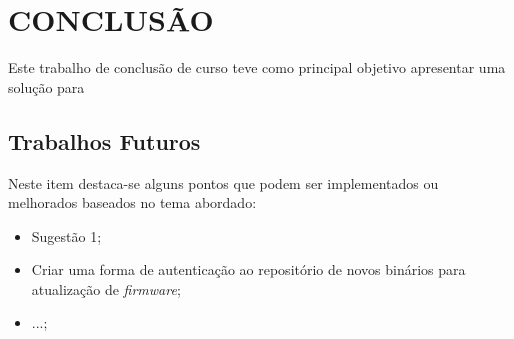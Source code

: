 
\chapter{CONCLUSÃO}
\label{chap:conclusao}

Este trabalho de conclusão de curso teve como principal objetivo apresentar uma solução para 

\section{Trabalhos Futuros}
\label{sec:trabalhosFuturos}

Neste item destaca-se alguns pontos que podem ser implementados ou melhorados baseados no tema abordado:

\begin{itemize}
\item Sugestão 1;
\item Criar uma forma de autenticação ao repositório de novos binários para atualização de \textit{firmware};
\item ...;
\end{itemize}
